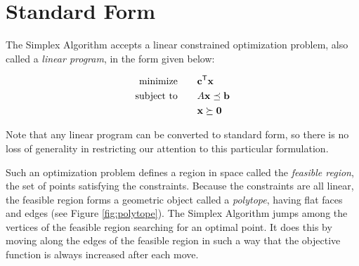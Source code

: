 \label{lab:Simplex}


\section*{Standard Form} %

The Simplex Algorithm accepts a linear constrained optimization problem, also called a \emph{linear program}, in the form given below:

\begin{align*}
\text{minimize}\qquad &\mathbf{c}^{\mathsf T}\mathbf{x} \\
\text{subject to}\qquad & A\mathbf{x} \preceq \mathbf{b} \\
 &\mathbf{x} \succeq \mathbf{0}
\end{align*}

Note that any linear program can be converted to standard form, so there is no loss of generality in restricting our attention to this particular formulation.

Such an optimization problem defines a region in space called the \emph{feasible region}, the set of points satisfying the constraints.
Because the constraints are all linear, the feasible region forms a geometric object called a \emph{polytope}, having flat faces and edges (see Figure \ref{fig:polytope}).
The Simplex Algorithm jumps among the vertices of the feasible region searching for an optimal point.
It does this by moving along the edges of the feasible region in such a way that the objective function is always increased after each move.

